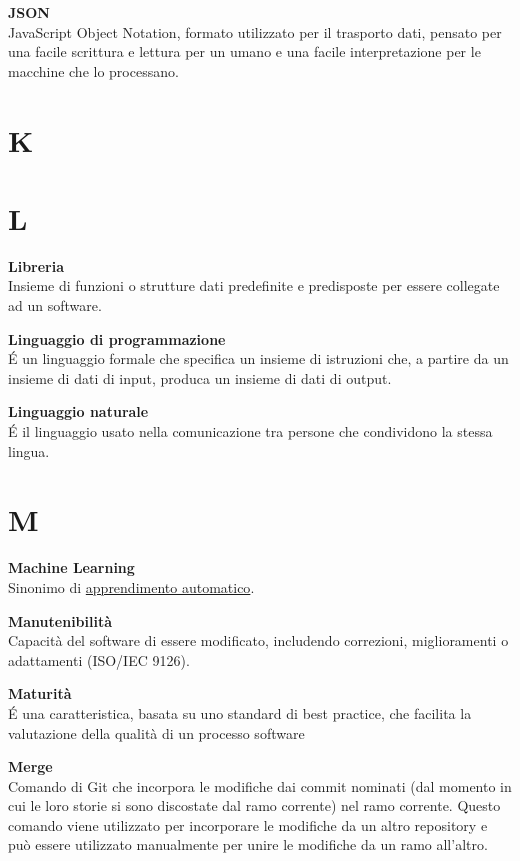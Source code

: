 \documentclass[a4paper, oneside, openany, dvipsnames, table, 12pt]{article}
\begin{document}
\textbf{JSON} \\
JavaScript Object Notation, formato utilizzato per il trasporto dati, pensato
per una facile scrittura e lettura per un umano e una facile interpretazione per
le macchine che lo processano.

\newpage
\section{K}

\newpage
\section{L}
\textbf{Libreria} \\
Insieme di funzioni o strutture dati predefinite e predisposte per essere collegate ad un software. 

\textbf{Linguaggio di programmazione} \\
\'E un linguaggio formale che specifica un insieme di istruzioni che, a partire da un insieme di dati di input, produca un insieme di dati di output.

\textbf{Linguaggio naturale} \\
\'E il linguaggio usato nella comunicazione tra persone che condividono la stessa lingua.

\newpage
\section{M}
\textbf{Machine Learning} \\
Sinonimo di \hyperref[par:appr_auto]{apprendimento automatico\glo}.

\textbf{Manutenibilità} \\
Capacità del software di essere modificato, includendo correzioni, miglioramenti o adattamenti (ISO/IEC 9126).

\textbf{Maturità} \\
\'E una caratteristica, basata su uno standard di best practice\glo, che facilita la valutazione della qualità di un processo software

\textbf{Merge} \\
Comando di Git che incorpora le modifiche dai commit nominati (dal momento in cui le loro storie si sono discostate dal ramo corrente) nel ramo corrente. Questo comando viene utilizzato per incorporare le modifiche
da un altro repository e può essere utilizzato manualmente per unire le modifiche da un ramo all’altro.
\end{document}
